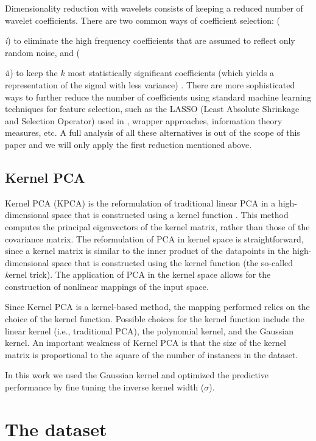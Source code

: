 \documentclass[a4paper,fleqn,usenatbib]{mnras}
\begin{document}
{Dimensionality reduction with wavelets consists of keeping a reduced
number of wavelet coefficients. There are two common ways of
coefficient selection: ({\textit i) to eliminate the high frequency
  coefficients that are assumed to reflect only random noise, and
  ({\textit ii) to keep the $k$ most statistically significant
    coefficients (which yields a representation of the signal with
    less variance) \citep{li:10}. There are more sophisticated ways to
    further reduce the number of coefficients using standard machine
    learning techniques for feature selection, such as the LASSO
    (Least Absolute Shrinkage and Selection Operator) used in
    \cite{2015MNRAS.452.1394L}, wrapper approaches, information theory
    measures, etc. A full analysis of all these alternatives is out of
    the scope of this paper and we will only apply the first reduction
    mentioned above.

\subsection{Kernel PCA}

Kernel PCA (KPCA) is the reformulation of traditional linear PCA in a
high-dimensional space that is constructed using a kernel function
\citep{sholkopf:98}. This method computes the principal eigenvectors
of the kernel matrix, rather than those of the covariance matrix. The
reformulation of PCA in kernel space is straightforward, since a
kernel matrix is similar to the inner product of the datapoints in the
high-dimensional space that is constructed using the kernel function
(the so-called {\textit kernel trick}). The application of PCA in the
kernel space allows for the construction of nonlinear mappings of the
input space.

Since Kernel PCA is a kernel-based method, the mapping performed
relies on the choice of the kernel function. Possible choices for the
kernel function include the linear kernel (i.e., traditional PCA), the
polynomial kernel, and the Gaussian kernel. An important weakness of
Kernel PCA is that the size of the kernel matrix is proportional to
the square of the number of instances in the dataset.

In this work we used the Gaussian kernel and optimized the predictive
performance by fine tuning the inverse kernel width ($\sigma$).
 
\section{The dataset}

}}}
\end{document}
